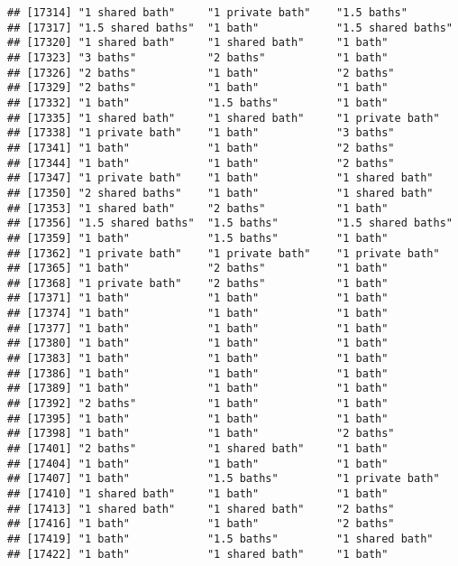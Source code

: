 \documentclass[
]{article}
\begin{document}
\begin{verbatim}
## [17314] "1 shared bath"     "1 private bath"    "1.5 baths"        
## [17317] "1.5 shared baths"  "1 bath"            "1.5 shared baths" 
## [17320] "1 shared bath"     "1 shared bath"     "1 bath"           
## [17323] "3 baths"           "2 baths"           "1 bath"           
## [17326] "2 baths"           "1 bath"            "2 baths"          
## [17329] "2 baths"           "1 bath"            "1 bath"           
## [17332] "1 bath"            "1.5 baths"         "1 bath"           
## [17335] "1 shared bath"     "1 shared bath"     "1 private bath"   
## [17338] "1 private bath"    "1 bath"            "3 baths"          
## [17341] "1 bath"            "1 bath"            "2 baths"          
## [17344] "1 bath"            "1 bath"            "2 baths"          
## [17347] "1 private bath"    "1 bath"            "1 shared bath"    
## [17350] "2 shared baths"    "1 bath"            "1 shared bath"    
## [17353] "1 shared bath"     "2 baths"           "1 bath"           
## [17356] "1.5 shared baths"  "1.5 baths"         "1.5 shared baths" 
## [17359] "1 bath"            "1.5 baths"         "1 bath"           
## [17362] "1 private bath"    "1 private bath"    "1 private bath"   
## [17365] "1 bath"            "2 baths"           "1 bath"           
## [17368] "1 private bath"    "2 baths"           "1 bath"           
## [17371] "1 bath"            "1 bath"            "1 bath"           
## [17374] "1 bath"            "1 bath"            "1 bath"           
## [17377] "1 bath"            "1 bath"            "1 bath"           
## [17380] "1 bath"            "1 bath"            "1 bath"           
## [17383] "1 bath"            "1 bath"            "1 bath"           
## [17386] "1 bath"            "1 bath"            "1 bath"           
## [17389] "1 bath"            "1 bath"            "1 bath"           
## [17392] "2 baths"           "1 bath"            "1 bath"           
## [17395] "1 bath"            "1 bath"            "1 bath"           
## [17398] "1 bath"            "1 bath"            "2 baths"          
## [17401] "2 baths"           "1 shared bath"     "1 bath"           
## [17404] "1 bath"            "1 bath"            "1 bath"           
## [17407] "1 bath"            "1.5 baths"         "1 private bath"   
## [17410] "1 shared bath"     "1 bath"            "1 bath"           
## [17413] "1 shared bath"     "1 shared bath"     "2 baths"          
## [17416] "1 bath"            "1 bath"            "2 baths"          
## [17419] "1 bath"            "1.5 baths"         "1 shared bath"    
## [17422] "1 bath"            "1 shared bath"     "1 bath"           

\end{verbatim}
\end{document}
